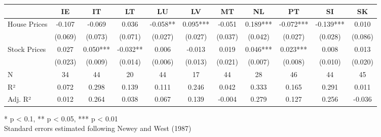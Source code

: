 \begin{table}[h]
\fontsize{7.5pt}{9.0pt}\selectfont
\begin{tabular*}{\linewidth}{@{\extracolsep{\fill}}lcccccccccc}
\toprule
  & IE & IT & LT & LU & LV & MT & NL & PT & SI & SK \\ 
\midrule\addlinespace[2.5pt]
House Prices & -0.107 & -0.069 & 0.036 & -0.058** & 0.095*** & -0.051 & 0.189*** & -0.072*** & -0.139*** & 0.010 \\ 
 & (0.069) & (0.073) & (0.071) & (0.027) & (0.027) & (0.037) & (0.042) & (0.027) & (0.028) & (0.086) \\ 
Stock Prices & 0.027 & 0.050*** & -0.032** & 0.006 & -0.013 & 0.019 & 0.046*** & 0.023*** & 0.008 & 0.013 \\ 
{} & {(0.023)} & {(0.009)} & {(0.014)} & {(0.006)} & {(0.013)} & {(0.021)} & {(0.007)} & {(0.008)} & {(0.010)} & {(0.020)} \\ 
N & 34 & 44 & 20 & 44 & 17 & 44 & 28 & 46 & 44 & 45 \\ 
R² & 0.072 & 0.298 & 0.139 & 0.111 & 0.246 & 0.042 & 0.333 & 0.165 & 0.291 & 0.011 \\ 
Adj. R² & 0.012 & 0.264 & 0.038 & 0.067 & 0.139 & -0.004 & 0.279 & 0.127 & 0.256 & -0.036 \\ 
\bottomrule
\end{tabular*}
\begin{minipage}{\linewidth}
* p < 0.1, ** p < 0.05, *** p < 0.01\\
Standard errors estimated following Newey and West (1987)\\
\end{minipage}
\end{table}

